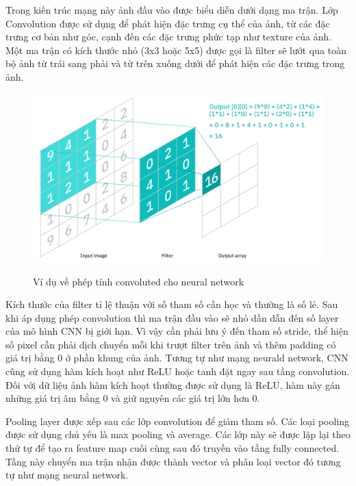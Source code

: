 Trong kiến trúc mạng này ảnh đầu vào được biểu diễn dưới dạng ma trận. Lớp Convolution được sử dụng để phát hiện đặc trưng cụ thể của ảnh, từ các đặc trưng cơ bản như góc, cạnh đến các đặc trưng phức tạp như texture của ảnh. Một ma trận có kích thước nhỏ (3x3 hoặc 5x5) được gọi là filter sẽ lướt qua toàn bộ ảnh từ trái sang phải và từ trên xuống dưới để phát hiện các đặc trưng trong ảnh. 

\begin{figure}
    \centering
    \includegraphics[width=\textwidth]{images/Quanh/cnn.png}
    \caption{Ví dụ về phép tính convoluted cho neural network} \cite{deeplearningphoton}
\end{figure}

Kích thước của filter tỉ lệ thuận với số tham số cần học và thường là số lẻ. Sau khi áp dụng phép convolution thì ma trận đầu vào sẽ nhỏ dần dẫn đến số layer của mô hình CNN bị giới hạn. Vì vậy cần phải lưu ý đến tham số stride, thể hiện số pixel cần phải dịch chuyển mỗi khi trượt filter trên ảnh và thêm padding có giá trị bằng 0 ở phần khung của ảnh. Tương tự như mạng neurald network, CNN cũng sử dụng hàm kích hoạt như ReLU hoặc tanh đặt ngay sau tầng convolution. Đối với dữ liệu ảnh hàm kích hoạt thường được sử dụng là ReLU, hàm này gán những giá trị âm bằng 0 và giữ nguyên các giá trị lớn hơn 0.

Pooling layer được xếp sau các lớp convolution để giảm tham số. Các loại pooling được sử dụng chủ yếu là max pooling và average. Các lớp này sẽ được lặp lại theo thứ tự để tạo ra feature map cuối cùng sau đó truyền vào tầng fully connected. Tầng này chuyển ma trận nhận được thành vector và phân loại vector đó tương tự như mạng neural network.

